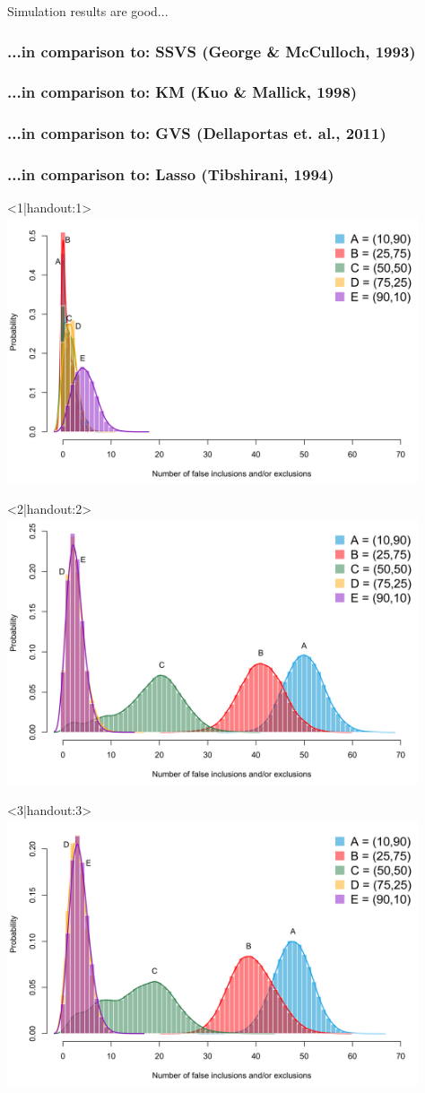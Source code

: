 \documentclass[]{beamer}\usepackage[]{graphicx}\usepackage[]{color}
\begin{document}
\begin{frame}{Simulation results are good...}
	\frametitle<2|handout:2>{...in comparison to: SSVS (George \& McCulloch, 1993)}
	\frametitle<3|handout:3>{...in comparison to: KM (Kuo \& Mallick, 1998)}
	\frametitle<4|handout:4>{...in comparison to: GVS (Dellaportas et. al., 2011)}
	\frametitle<5|handout:5>{...in comparison to: Lasso (Tibshirani, 1994)}
	\vspace{-1mm}
	\begin{onlyenv}<1|handout:1>
		\includegraphics[height=3.1in]{figure/sim5}
	\end{onlyenv}
	\begin{onlyenv}<2|handout:2>
		\includegraphics[height=3.1in]{figure/sim1}
	\end{onlyenv}
	\begin{onlyenv}<3|handout:3>
		\includegraphics[height=3.1in]{figure/sim2}

\end{onlyenv}
\end{frame}
\end{document}
